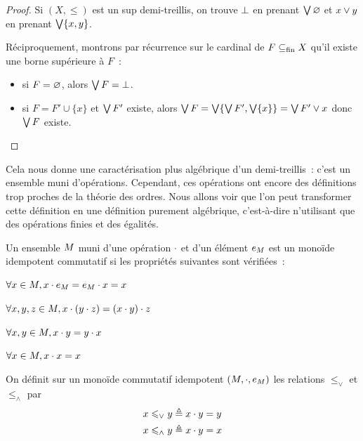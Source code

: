 \begin{proof}
  Si $(X,\leq)$ est un sup demi-treillis, on trouve $\bot$ en prenant
  $\bigvee\varnothing$ et $x\vee y$ en prenant $\bigvee\{x,y\}$.

  Réciproquement, montrons par récurrence sur le cardinal de $F\subseteq_{\mathrm{fin}} X$ qu'il
  existe une borne supérieure à $F$~:
  \begin{itemize}
  \item si $F = \varnothing$, alors $\bigvee F = \bot$.
  \item si $F = F' \cup \{x\}$ et $\bigvee F'$ existe, alors
    $\bigvee F = \bigvee \{\bigvee F',\bigvee \{x\}\} = \bigvee F' \vee x$
    donc $\bigvee F$ existe. \qedhere
  \end{itemize}
\end{proof}

Cela nous donne une caractérisation plus algébrique d'un demi-treillis~: c'est
un ensemble muni d'opérations. Cependant, ces opérations ont encore des
définitions trop proches de la théorie des ordres. Nous allons voir que l'on
peut transformer cette définition en une définition purement algébrique,
c'est-à-dire n'utilisant que des opérations finies et des égalités.

\begin{definition}\label{def.monoid.ci}
  Un ensemble $M$ muni d'une opération $\mathbin{\cdot}$ et d'un élément $e_{M}$ est
  un monoïde idempotent commutatif si les propriétés suivantes sont vérifiées~:
  
  \vspace{0.2cm}
  \begin{itemize}
    \begin{minipage}{0.5\textwidth}
    \item $\forall x\in M, x\mathbin{\cdot} e_{M} = e_{M} \mathbin{\cdot} x = x$
    \item $\forall x,y,z\in M, x \mathbin{\cdot} (y \mathbin{\cdot} z) = (x \mathbin{\cdot} y) \mathbin{\cdot} z$
    \end{minipage}
    \begin{minipage}{0.4\textwidth}
    \item $\forall x,y\in M, x\mathbin{\cdot} y = y \mathbin{\cdot} x$
    \item $\forall x\in M, x\mathbin{\cdot} x = x$
    \end{minipage}
  \end{itemize}

  On définit sur un monoïde commutatif idempotent $(M,\mathbin{\cdot},e_{M})$ les
  relations $\leq_\lor$ et $\leq_\land$ par
  \begin{align*}
    x \leqslant_{\vee} y &\triangleq x \mathbin{\cdot} y = y \\
    x \leqslant_{\wedge} y &\triangleq x \mathbin{\cdot} y = x
  \end{align*}
\end{definition}

